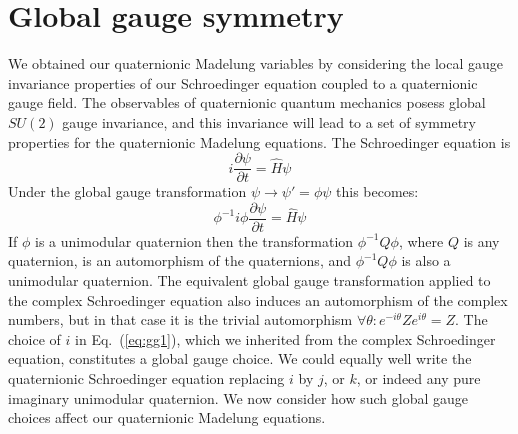 \documentclass[a4paper,aps,prd,preprint,groupedaddress]{revtex4}
\begin{document}
\section{Global gauge symmetry\label{sec:app3}}
We obtained our quaternionic Madelung variables by considering the local gauge invariance properties of our Schroedinger equation coupled to a quaternionic gauge field. The observables of quaternionic quantum mechanics posess global $SU(2)$ gauge invariance, and this invariance will lead to a set of symmetry properties for the quaternionic Madelung equations. The Schroedinger equation is
\begin{equation}\label{eq:gg1}
i\frac{\partial \psi}{\partial t} =\hat H\psi
\end{equation}
Under the global gauge transformation $\psi \rightarrow \psi' = \phi\psi$ this becomes:
\begin{equation}\label{eq:gg2}
\phi^{-1}i\phi\frac{\partial \psi}{\partial t} =\hat H \psi
\end{equation}
If $\phi$ is a unimodular quaternion then the transformation $\phi^{-1}Q\phi$, where $Q$ is any quaternion, is an automorphism of the quaternions, and $\phi^{-1}Q\phi$ is also a unimodular quaternion. The equivalent global gauge transformation applied to the complex Schroedinger equation also induces an automorphism of the complex numbers, but in that case it is the trivial automorphism $\forall \theta : e^{-i\theta}Ze^{i\theta} =Z $. The choice of $i$ in Eq.~(\ref{eq:gg1}), which we inherited from the complex Schroedinger  equation, constitutes a global gauge choice. We could equally well write the quaternionic Schroedinger equation replacing $i$ by $j$, or $k$, or indeed any pure imaginary unimodular quaternion. We now consider how such global gauge choices affect our quaternionic Madelung equations.
\end{document}

